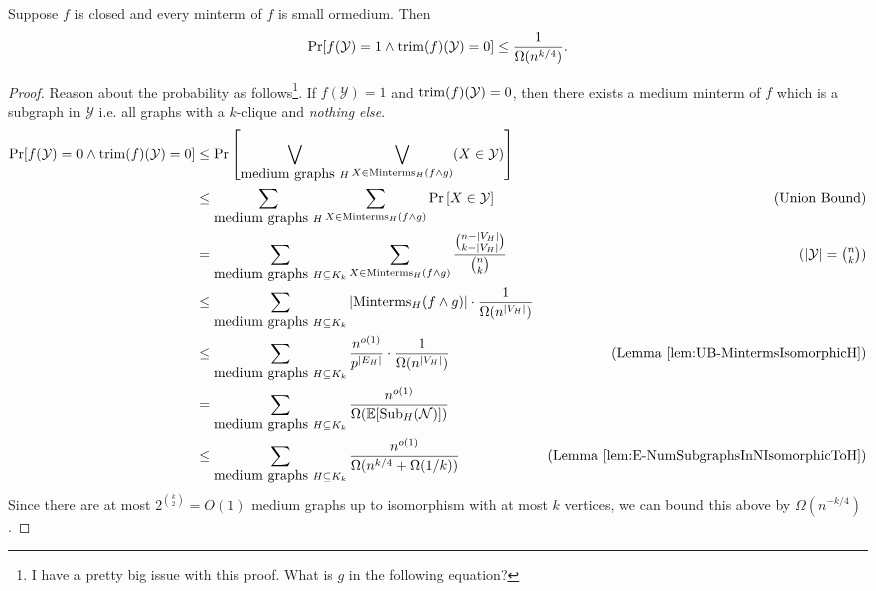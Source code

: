 \documentclass[11pt]{article}
\begin{document}
 	\begin{lemma}
	\label{lem:UB-ProbFunctionDiffersFromTrim}
	Suppose $f$ is closed and every minterm of $f$ is small ormedium. Then 
	\[\Pr[f(\mathcal{Y}) = 1 \land \mathrm{trim}(f)(\mathcal{Y}) = 0] \leq \frac{1}{\Omega(n^{k/4})}.\]
 	\end{lemma}
 	\begin{proof}
 		Reason about the probability as follows\footnote{I have a pretty big issue with this proof. What is $g$ in the following equation?}. If $f(\mathcal{Y}) = 1$ and $\mathrm{trim}(f)(\mathcal{Y}) = 0$, then there exists a medium minterm of $f$ which is a subgraph in $\mathcal{Y}$ i.e. all graphs with a $k$-clique and \emph{nothing else}. 
 		\begin{align*}
 			\Pr[f(\mathcal{Y}) = 0 \land \mathrm{trim}(f)(\mathcal{Y}) = 0] &\leq \Pr\left[\bigvee_{\mbox{medium graphs }H} \bigvee_{X \in \mathrm{Minterms}_H(f \land g)}(X \in \mathcal{Y})\right]\\
 			&\leq \sum_{\mbox{medium graphs }H} \sum_{X \in \mathrm{Minterms}_H(f \land g)}\Pr\left[X \in \mathcal{Y}\right] &\mbox{(Union Bound)}\\
 			&= \sum_{\mbox{medium graphs }H \subseteq K_k} \sum_{X \in \mathrm{Minterms}_H(f \land g)}\frac{\binom{n-|V_H|}{k - |V_H|}}{\binom{n}{k}} &\mbox{($|\mathcal{Y}| = \binom{n}{k}$)}\\
 			&\leq \sum_{\mbox{medium graphs }H \subseteq K_k} |\mathrm{Minterms}_H(f \land g)|\cdot \frac{1}{\Omega(n^{|V_H|})}\\
 			&\leq \sum_{\mbox{medium graphs }H \subseteq K_k} \frac{n^{o(1)}}{p^{|E_H|}} \cdot \frac{1}{\Omega(n^{|V_H|})} &\mbox{(Lemma \ref{lem:UB-MintermsIsomorphicH})}\\
 			&= \sum_{\mbox{medium graphs }H \subseteq K_k} \frac{n^{o(1)}}{\Omega(\operatorname{\mathbb{E}}[\mathrm{Sub}_H(\mathcal{N})])}\\
 			&\leq \sum_{\mbox{medium graphs }H \subseteq K_k} \frac{n^{o(1)}}{\Omega(n^{k/4} + \Omega(1/k))} &\mbox{(Lemma \ref{lem:E-NumSubgraphsInNIsomorphicToH})}
 		\end{align*}
 		Since there are at most $2^{\binom{k}{2}} = O(1)$ medium graphs up to isomorphism with at most $k$ vertices, we can bound this above by $\Omega(n^{-k/4})$. 
 	\end{proof}
 
\end{document}
